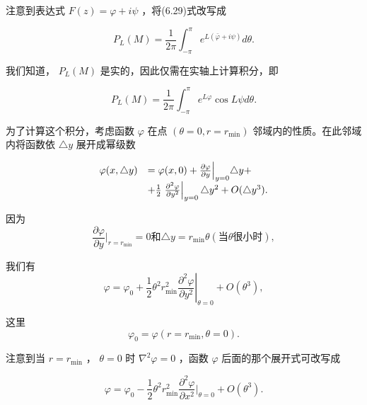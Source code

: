 注意到表达式 $F(z) = \varphi + i\psi$ ，将(6.29)式改写成

\begin{equation*}
P _ {L} (M) = \frac {1}{2 \pi} \int_ {- \pi} ^ {\pi} e ^ {L (\bar {\varphi} + i \psi)} d \theta .
\end{equation*}

我们知道， $P_{L}(M)$ 是实的，因此仅需在实轴上计算积分，即

\begin{equation*}
P _ {L} (M) = \frac {1}{2 \pi} \int_ {- \pi} ^ {\pi} e ^ {L \varphi} \cos L \psi d \theta .\tag{6.35a}
\end{equation*}

为了计算这个积分，考虑函数 $\varphi$ 在点 $(\theta = 0, r = r_{\min})$ 邻域内的性质。在此邻域内将函数依 $\triangle y$ 展开成幂级数

\begin{equation*}
\begin{array}{r l} \varphi (x, \triangle y) & = \varphi (x, 0) + \frac {\partial \varphi}{\partial y} \Big | _ {y = 0} \triangle y + \\ & + \frac {1}{2} \left. \frac {\partial^ {2} \varphi}{\partial y ^ {2}} \right| _ {y = 0} \triangle y ^ {2} + O (\triangle y ^ {3}). \end{array}
\end{equation*}

因为
\begin{equation*}
\frac {\partial \varphi}{\partial y} \Bigg | _ {r = r _ {\mathrm{min}}} = 0 \text {和} \triangle y = r _ {\mathrm{min}} \theta (\text {当} \theta \text {很小时}),
\end{equation*}

我们有
\begin{equation*}
\varphi = \varphi_ {0} + \frac {1}{2} \theta^ {2} r _ {\min} ^ {2} \left. \frac {\partial^ {2} \varphi}{\partial y ^ {2}} \right| _ {\theta = 0} + O (\theta^ {3}),
\end{equation*}

这里
\begin{equation*}
\varphi_ {0} = \varphi (r = r _ {\min}, \theta = 0).
\end{equation*}

注意到当 $r = r_{\min}$ ， $\theta = 0$ 时 $\nabla^2\varphi = 0$ ，函数 $\varphi$ 后面的那个展开式可改写成

\begin{equation*}
\varphi = \varphi_ {0} - \frac {1}{2} \theta^ {2} r _ {\min} ^ {2} \frac {\partial^ {2} \varphi}{\partial x ^ {2}} \Bigg | _ {\theta = 0} + O (\theta^ {3}).
\end{equation*}

